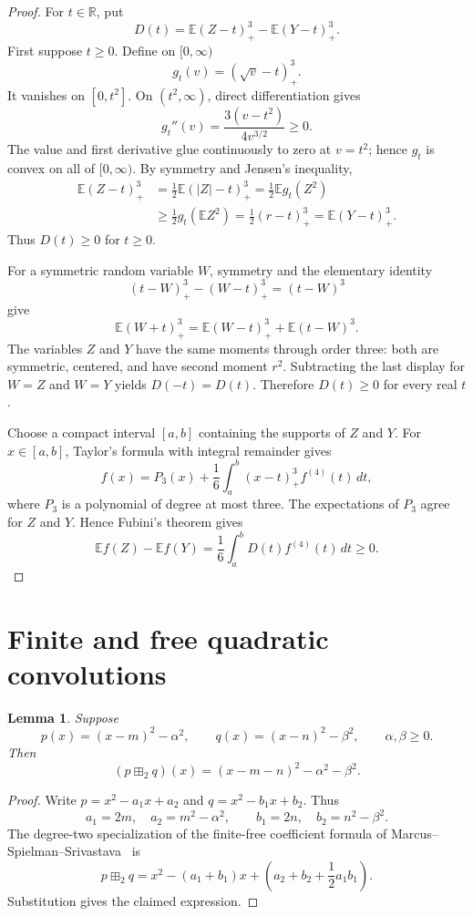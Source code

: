 \documentclass[11pt]{article}
\newtheorem{lemma}[theorem]{Lemma}
\theoremstyle{remark}
\newcommand{\R}{\mathbb{R}}
\newcommand{\E}{\mathbb{E}}
\newcommand{\ffbox}{\mathbin{\boxplus_{2}}}
\newcommand{\pos}[1]{\left(#1\right)_{+}}
\begin{document}
\begin{proof}
For $t\in\R$, put
\[
 D(t)=\E\pos{Z-t}^3-\E\pos{Y-t}^3.
\]
First suppose $t\geq0$.  Define on $[0,\infty)$
\[
 g_t(v)=\pos{\sqrt v-t}^3.
\]
It vanishes on $[0,t^2]$.  On $(t^2,\infty)$, direct differentiation gives
\[
 g_t''(v)=\frac{3(v-t^2)}{4v^{3/2}}\geq0.
\]
The value and first derivative glue continuously to zero at $v=t^2$;
hence $g_t$ is convex on all of $[0,\infty)$.  By symmetry and Jensen's
inequality,
\begin{align*}
 \E\pos{Z-t}^3
 &=\frac12\E\pos{|Z|-t}^3
  =\frac12\E g_t(Z^2)\\
 &\geq\frac12 g_t(\E Z^2)
  =\frac12\pos{r-t}^3
  =\E\pos{Y-t}^3.
\end{align*}
Thus $D(t)\geq0$ for $t\geq0$.

For a symmetric random variable $W$, symmetry and the elementary identity
\[
 \pos{t-W}^3-\pos{W-t}^3=(t-W)^3
\]
give
\[
 \E\pos{W+t}^3
 =\E\pos{W-t}^3+\E(t-W)^3.
\]
The variables $Z$ and $Y$ have the same moments through order three:
both are symmetric, centered, and have second moment $r^2$.  Subtracting the
last display for $W=Z$ and $W=Y$ yields $D(-t)=D(t)$.  Therefore
$D(t)\geq0$ for every real $t$.

Choose a compact interval $[a,b]$ containing the supports of $Z$ and $Y$.
For $x\in[a,b]$, Taylor's formula with integral remainder gives
\[
 f(x)=P_3(x)+\frac16\int_a^b\pos{x-t}^3 f^{(4)}(t)\,dt,
\]
where $P_3$ is a polynomial of degree at most three.  The expectations of
$P_3$ agree for $Z$ and $Y$.  Hence Fubini's theorem gives
\[
 \E f(Z)-\E f(Y)
 =\frac16\int_a^b D(t)f^{(4)}(t)\,dt\geq0.
\]
\end{proof}

\section{Finite and free quadratic convolutions}

\begin{lemma}\label{lem:finite}
Suppose
\[
 p(x)=(x-m)^2-\alpha^2,
 \qquad q(x)=(x-n)^2-\beta^2,
 \qquad \alpha,\beta\geq0.
\]
Then
\[
 (p\ffbox q)(x)=(x-m-n)^2-\alpha^2-\beta^2.
\]
\end{lemma}

\begin{proof}
Write $p=x^2-a_1x+a_2$ and $q=x^2-b_1x+b_2$.  Thus
\[
 a_1=2m,\quad a_2=m^2-\alpha^2,
 \qquad b_1=2n,\quad b_2=n^2-\beta^2.
\]
The degree-two specialization of the finite-free coefficient formula
of Marcus--Spielman--Srivastava~\cite{MSS2022} is
\[
 p\ffbox q=x^2-(a_1+b_1)x+
 \left(a_2+b_2+\frac12a_1b_1\right).
\]
Substitution gives the claimed expression.
\end{proof}
\end{document}
